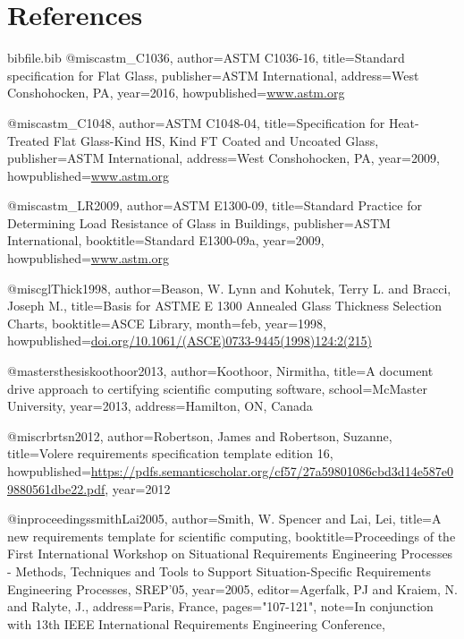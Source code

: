 \documentclass[12pt]{article}
\begin{document}
\section{References}
\label{Sec:References}
\begin{filecontents*}{bibfile.bib}
@misc{astm\_C1036,
author={ASTM C1036-16},
title={Standard specification for Flat Glass},
publisher={ASTM International},
address={West Conshohocken, PA},
year={2016},
howpublished={\url{www.astm.org}}}

@misc{astm\_C1048,
author={ASTM C1048-04},
title={Specification for Heat-Treated Flat Glass-Kind HS, Kind FT Coated and Uncoated Glass},
publisher={ASTM International},
address={West Conshohocken, PA},
year={2009},
howpublished={\url{www.astm.org}}}

@misc{astm\_LR2009,
author={ASTM E1300-09},
title={Standard Practice for Determining Load Resistance of Glass in Buildings},
publisher={ASTM International},
booktitle={Standard E1300-09a},
year={2009},
howpublished={\url{www.astm.org}}}

@misc{glThick1998,
author={Beason, W. Lynn and Kohutek, Terry L. and Bracci, Joseph M.},
title={Basis for ASTME E 1300 Annealed Glass Thickness Selection Charts},
booktitle={ASCE Library},
month={feb},
year={1998},
howpublished={\url{doi.org/10.1061/(ASCE)0733-9445(1998)124:2(215)}}}

@mastersthesis{koothoor2013,
author={Koothoor, Nirmitha},
title={A document drive approach to certifying scientific computing software},
school={McMaster University},
year={2013},
address={Hamilton, ON, Canada}}

@misc{rbrtsn2012,
author={Robertson, James and Robertson, Suzanne},
title={Volere requirements specification template edition 16},
howpublished={\url{https://pdfs.semanticscholar.org/cf57/27a59801086cbd3d14e587e09880561dbe22.pdf}},
year={2012}}

@inproceedings{smithLai2005,
author={Smith, W. Spencer and Lai, Lei},
title={A new requirements template for scientific computing},
booktitle={Proceedings of the First International Workshop on Situational Requirements Engineering Processes - Methods, Techniques and Tools to Support Situation-Specific Requirements Engineering Processes, SREP'05},
year={2005},
editor={Agerfalk, PJ and Kraiem, N. and Ralyte, J.},
address={Paris, France},
pages={"107-121"},
note={In conjunction with 13th IEEE International Requirements Engineering Conference,}}
\end{filecontents*}
\nocite{*}
\printbibliography[heading=none]
\end{document}
